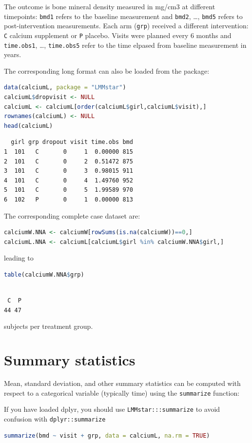 \documentclass[12pt]{article}
\newcommand\Warning[1][3ex]{%
\renewcommand\stacktype{L}%
\scaleto{\stackon[1.3pt]{\color{red}$\triangle$}{\tiny\bfseries !}}{#1}%
\xspace
}
\begin{document}
The outcome is bone mineral density measured in mg/cm3 at different
timepoints: \texttt{bmd1} refers to the baseline measurement and \texttt{bmd2},
\ldots, \texttt{bmd5} refers to post-intervention measurements. Each arm
(\texttt{grp}) received a different intervention: \texttt{C} calcium supplement or
\texttt{P} placebo. Visits were planned every 6 months and \texttt{time.obs1},
\ldots, \texttt{time.obs5} refer to the time elpased from baseline
measurement in years.

\bigskip

The corresponding long format can also be loaded from
the package:
\begin{lstlisting}[language=r,numbers=none]
data(calciumL, package = "LMMstar")
calciumL$dropvisit <- NULL
calciumL <- calciumL[order(calciumL$girl,calciumL$visit),]
rownames(calciumL) <- NULL
head(calciumL)
\end{lstlisting}

\label{}
\begin{verbatim}
  girl grp dropout visit time.obs bmd
1  101   C       0     1  0.00000 815
2  101   C       0     2  0.51472 875
3  101   C       0     3  0.98015 911
4  101   C       0     4  1.49760 952
5  101   C       0     5  1.99589 970
6  102   P       0     1  0.00000 813
\end{verbatim}


The corresponding complete case dataset are:
\begin{lstlisting}[language=r,numbers=none]
calciumW.NNA <- calciumW[rowSums(is.na(calciumW))==0,]
calciumL.NNA <- calciumL[calciumL$girl %in% calciumW.NNA$girl,]
\end{lstlisting}

leading to
\begin{lstlisting}[language=r,numbers=none]
table(calciumW.NNA$grp)
\end{lstlisting}

\label{}
\begin{verbatim}

 C  P 
44 47
\end{verbatim}


subjects per treatment group.

\clearpage
\section{Summary statistics}
\label{sec:org523ec36}

Mean, standard deviation, and other summary statistics can be computed
with respect to a categorical variable (typically time) using the
\texttt{summarize} function: \newline \Warning If you have loaded dplyr, you
should use \texttt{LMMstar:::summarize} to avoid confusion with \texttt{dplyr::summarize}
\begin{lstlisting}[language=r,numbers=none]
summarize(bmd ~ visit + grp, data = calciumL, na.rm = TRUE)
\end{lstlisting}
\end{document}
